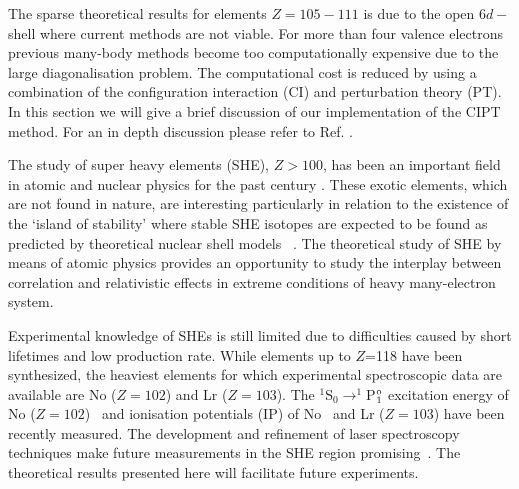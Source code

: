 \documentclass[10pt,a4paper, twoside, openright]{report}
\begin{document}
The sparse theoretical results for elements $Z=105-111$ is due to the open $6d-$shell where current methods are not viable. For more than four valence electrons previous many-body methods become too computationally expensive due to the large diagonalisation problem. The computational cost is reduced by using a combination of the configuration interaction (CI) and perturbation theory (PT). In this section we will give a brief discussion of our implementation of the CIPT method. For an in depth discussion please refer to Ref. \cite{DBHF2017}. 

The study of super heavy elements (SHE), $Z > 100$, has been an important field in atomic and nuclear physics for the 
past century \cite{Oganessian2009,  HHO2013}.  These exotic elements, which are not found in nature, are interesting
particularly in relation to the existence of the `island of stability' where stable SHE isotopes are expected to be found 
as predicted by theoretical nuclear shell models ~\cite{OUL2004, HHO2013, Leino2016, Oganessian2012}. 
The theoretical study of SHE by means of atomic physics provides an opportunity to study the interplay between correlation and
relativistic effects in extreme conditions of heavy many-electron system.


Experimental knowledge of SHEs is still limited due to difficulties caused by  short lifetimes and low production rate.
While elements up to $Z$=118 have been synthesized, the heaviest elements for which experimental spectroscopic data 
are available are No ($Z=102$) and Lr  ($Z=103$).
The $^1$S$_0 \rightarrow ^1$P$^{\rm o}_1$ excitation energy of No  ($Z=102$)~\cite{Laatiaoui2016} 
and ionisation potentials (IP) of No~\cite{Laatiaoui2016} and Lr ($Z=103$) \cite{SAB15} have been recently measured. 
The development and refinement of laser spectroscopy techniques make future measurements in 
the SHE region promising~\cite{Laatiaoui2014, Laatiaoui20161, Ferrer2017}. 
The theoretical results presented here will facilitate future experiments. 
\end{document}
